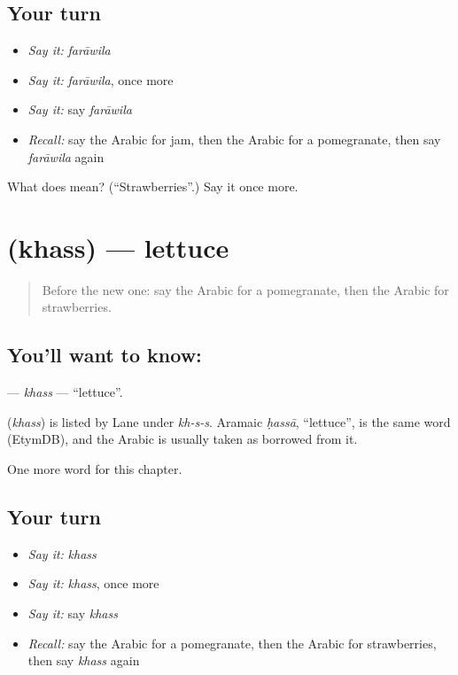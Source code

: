 \subsection*{Your turn}
\begin{itemize}
\raggedright
  \item \emph{Say it:} \emph{farāwila}
  \item \emph{Say it:} \emph{farāwila}, once more
  \item \emph{Say it:} say \emph{farāwila}
  \item \emph{Recall:} say the Arabic for jam, then the Arabic for a pomegranate, then say \emph{farāwila} again
\end{itemize}

\begin{tcolorbox}[breakable,colback=teal!4,colframe=teal!35!black,title={Before you move on}]
What does  mean? (\textquotedblleft{}Strawberries\textquotedblright{}.) Say it once more.
\end{tcolorbox}
\section[\texorpdfstring{\ar{خس} (khass)}{خس (khass)}]{ (khass) — lettuce}

\label{lesson:AR-C120-khass}



\begin{quote}
Before the new one: say the Arabic for a pomegranate, then the Arabic for strawberries.
\end{quote}

\subsection*{You'll want to know: }
\textbf{} — \emph{khass} — \textquotedblleft{}lettuce\textquotedblright{}.

\begin{cousinweb}
\textbf{} (\emph{khass}) is listed by Lane under \emph{kh-s-s}. Aramaic \emph{ḥassā}, \textquotedblleft{}lettuce\textquotedblright{}, is the same word (EtymDB), and the Arabic is usually taken as borrowed from it.
\end{cousinweb}

\begin{grammarlens}[title={What you've built}]
One more word for this chapter.
\end{grammarlens}

\subsection*{Your turn}
\begin{itemize}
\raggedright
  \item \emph{Say it:} \emph{khass}
  \item \emph{Say it:} \emph{khass}, once more
  \item \emph{Say it:} say \emph{khass}
  \item \emph{Recall:} say the Arabic for a pomegranate, then the Arabic for strawberries, then say \emph{khass} again
\end{itemize}

